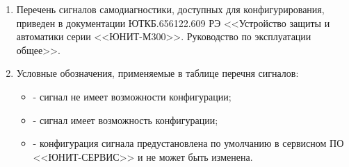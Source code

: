 \areaset{267mm}{180mm}
\fancyheadoffset{0pt} %


\begin{landscape}

\setlength{\footskip}{15.5pt}

\color{black}

\begin{enumerate}[label=\ref{app:signals}.\arabic*] %
  \item Перечень сигналов самодиагностики, доступных для конфигурирования, приведен в документации ЮТКБ.656122.609 РЭ <<Устройство защиты и автоматики серии <<ЮНИТ-М300>>. Руководство по эксплуатации общее>>.
  \item Условные обозначения, применяемые в таблице перечня сигналов:
  \begin{itemize}
    \item[$\text{(--)}$] { - сигнал не имеет возможности конфигурации;}
    \item[$\text{(+)}$] { - сигнал имеет возможность конфигурации;}
    \item[$\text{(*)}$] { - конфигурация сигнала предустановлена по умолчанию в сервисном ПО <<ЮНИТ-СЕРВИС>> и не может быть изменена.}
  \end{itemize}
\end{enumerate}

\small %
\begin{longtable}{
>{\centering\arraybackslash}m{6.0cm}
|>{\centering\arraybackslash}m{3.45cm}
|>{\centering\arraybackslash}m{2cm}
|>{\centering\arraybackslash}m{2cm}
|>{\centering\arraybackslash}m{2cm}
|>{\centering\arraybackslash}m{2cm}
|>{\centering\arraybackslash}m{2cm}
|>{\centering\arraybackslash}m{2cm}
|>{\centering\arraybackslash}m{2.107cm}
}


\end{longtable}
\end{landscape}
